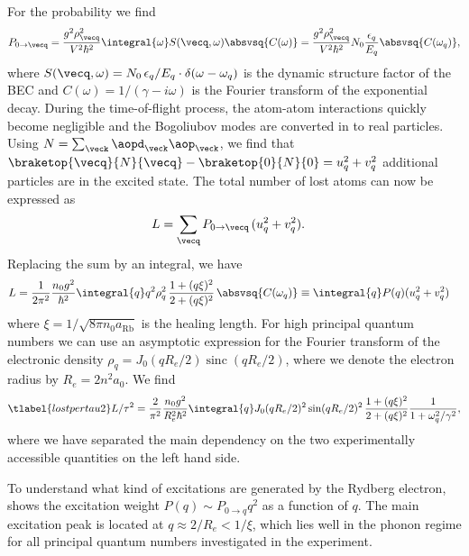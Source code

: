 For the probability we find
\begin{align}
P_{0\rightarrow\vecq}=\frac{g^2 \rho_{\vecq}^2 }{V^2\hbar^2}   \integral{\omega}S(\vecq,\omega)\absvsq{C(\omega)} = \frac{g^2 \rho_{\vecq}^2}{V^2\hbar^2} N_0 \frac{\epsilon_{q}}{E_{q}} \absvsq{C(\omega_q)},
\end{align}
where $S({\vecq},\omega)=N_0 \,\epsilon_{q}/E_{q} \cdot \delta(\omega-\omega_{q})$ is the dynamic structure factor of the BEC and $C(\omega)=1/(\gamma-i \omega)$ is the Fourier transform of the exponential decay.
During the time-of-flight process, the atom-atom interactions quickly become negligible and the Bogoliubov modes are converted in to real particles. Using $N=\sum_{\veck} \aopd_{\veck}\aop_{\veck}$, we find that $\braketop{\vecq}{N}{\vecq}-\braketop{0}{N}{0} = u_{q}^2+v_{q}^2$ additional particles are in the excited state. The total number of lost atoms can now be expressed as
\begin{align}
L &= \sum_{\vecq} P_{0\rightarrow\vecq}\, (u_{q}^2+v_{q}^2).
\end{align}
Replacing the sum by an integral, we have
\begin{align}
L&= \frac{1}{2\pi^2}\frac{n_0 g^2}{\hbar^2} \integral{q} q^2\rho_q^2\,\frac{1+(q\xi)^2}{2+(q\xi)^2} \, \absvsq{C(\omega_q)}  \equiv \integral{q} P(q) (u_{q}^2+v_{q}^2)
\end{align}
where $\xi=1/\sqrt{8\pi n_0 a_{\text{Rb}}}$ is the healing length. For high principal quantum numbers we can use an asymptotic expression for the Fourier transform of the electronic density $\rho_q=J_0(q R_e/2) \operatorname{sinc}(q R_e/2)$, where we denote the electron radius by $R_e=2n^2 a_0$. We find
\begin{align} \tlabel{lostpertau2}
L/\tau^2 = \frac{2}{\pi^2}\frac{n_0 g^2}{R_e^2 \hbar^2}\integral{q} J_0(q R_e/2)^2 \sin(q R_e/2)^2 \,\frac{1+(q\xi)^2}{2+(q\xi)^2} \frac{1}{1+\omega_q^2/\gamma^2},
\end{align}
where we have separated the main dependency on the two experimentally accessible quantities on the left hand side.


To understand what kind of excitations are generated by the Rydberg electron,  shows the excitation weight $P(q)\sim P_{0\rightarrow q} q^2$ as a function of $q$. The main excitation peak is located at $q\approx 2/R_e < 1/\xi$, which lies well in the phonon regime for all principal quantum numbers investigated in the experiment.








